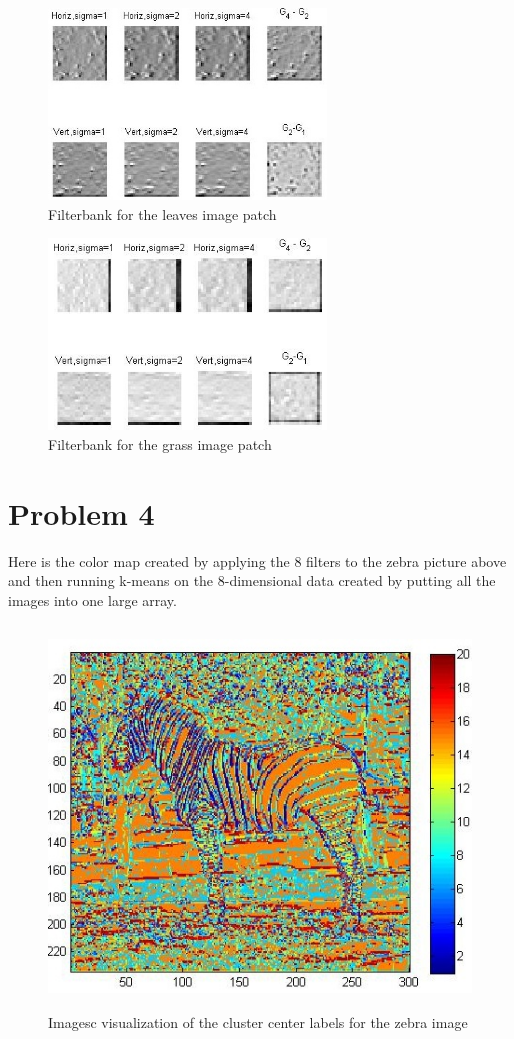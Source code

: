 \documentclass[11pt,psfig]{article}
\begin{document}
\begin{figure}[H]
\centering
\includegraphics[height=2in]{prob3patch2filter.jpg}
\caption{Filterbank for the leaves image patch}
\end{figure}

\begin{figure}[H]
\centering
\includegraphics[height=2in]{prob3patch3filter.jpg}
\caption{Filterbank for the grass image patch}
\end{figure}

\newpage

\section*{Problem 4}

Here is the color map created by applying the 8 filters to the zebra picture above and then running k-means on the 8-dimensional data created by putting all the images into one large array. 

\begin{figure}[H]
\centering
\includegraphics[height=4in]{prob4plot.jpg}
\caption{Imagesc visualization of the cluster center labels for the zebra image}
\end{figure}
\end{document}
